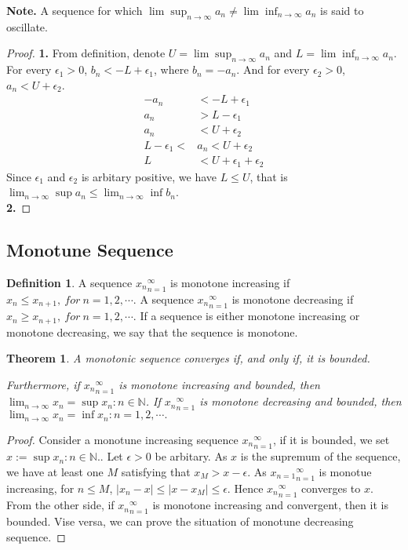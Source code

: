 \documentclass{article}
\newtheorem{theorem}{Theorem}[section]
\theoremstyle{definition}
\newtheorem{defi}{Definition}[section]
\begin{document}
\textbf{Note.} A sequence for which $\lim\sup_{n\rightarrow \infty}a_{n}\neq\lim\inf_{n\rightarrow \infty}a_{n} $ is said to oscillate.\\
\begin{proof}
\textbf{1.}
From definition, denote $U=\lim\sup_{n\rightarrow \infty}a_{n}$ and $L=\lim\inf_{n\rightarrow \infty}a_{n}$.
For every $\epsilon_{1}>0$, $b_{n}<-L+\epsilon_{1}$, where $b_{n}=-a_{n}$. And for every $\epsilon_{2}>0$, $a_{n}<U+\epsilon_{2}$.
\begin{align*}
    -a_{n} &< -L + \epsilon_{1} \\
    a_{n} &> L - \epsilon_{1} \\
    a_{n} &< U + \epsilon_{2} \\
    L - \epsilon_{1} < &a_{n} < U + \epsilon_{2} \\
    L &< U + \epsilon_{1} + \epsilon_{2}
\end{align*}
Since $\epsilon_{1}$ and $\epsilon_{2}$ is arbitary positive, 
we have $L\leq U$, that is $\lim_{n\rightarrow \infty}\sup a_{n}\leq\lim_{n\rightarrow \infty}\inf b_{n}$.\\
\textbf{2.}


\end{proof}

\subsection{Monotune Sequence}

\begin{defi}
A sequence ${x_{n}}_{n=1}^{\infty}$ is monotone increasing if ${x_{n}\leq x_{n+1}},\ for\ n=1,2,\cdots$.
A sequence ${x_{n}}_{n=1}^{\infty}$ is monotone decreasing if ${x_{n}\geq x_{n+1}},\ for\ n=1,2,\cdots$.
If a sequence is either monotone increasing or monotone decreasing, we say that the sequence is monotone.
\end{defi}

\begin{theorem}
    A monotonic sequence converges if, and only if, it is bounded.

    Furthermore, if ${x_{n}}_{n=1}^{\infty}$ is monotone increasing and bounded, then $\lim_{n\to \infty} x_{n}=\sup{x_{n}:n\in \mathbb{N}}$.
    If ${x_{n}}_{n=1}^{\infty}$ is monotone decreasing and bounded, then $\lim_{n\rightarrow \infty} x_{n}=\inf{x_{n}:n=1,2,\cdots}.$
\end{theorem}


\begin{proof}
Consider a monotune increasing sequence ${x_{n}}_{n=1}^{\infty}$, if it is bounded, we set $x:=\sup{x_{n}:n\in \mathbb{N}}.$. Let $\epsilon>0$ be arbitary. As $x$
is the supremum of the sequence, we have at least one $M$ satisfying that $x_{M}>x-\epsilon.$ As ${x_{n=1}}^{\infty}_{n=1}$ is monotue increasing, for $n\leq M$, $|x_{n}-x|\leq|x-x_{M}|\leq \epsilon.$ 
Hence ${x_{n}}_{n=1}^{\infty}$  converges to $x$. From the other side, if ${x_{n}}_{n=1}^{\infty}$ is monotone increasing and convergent, then it is bounded. Vise versa, we can prove the situation of monotune decreasing sequence.
\end{proof}  
\end{document}
